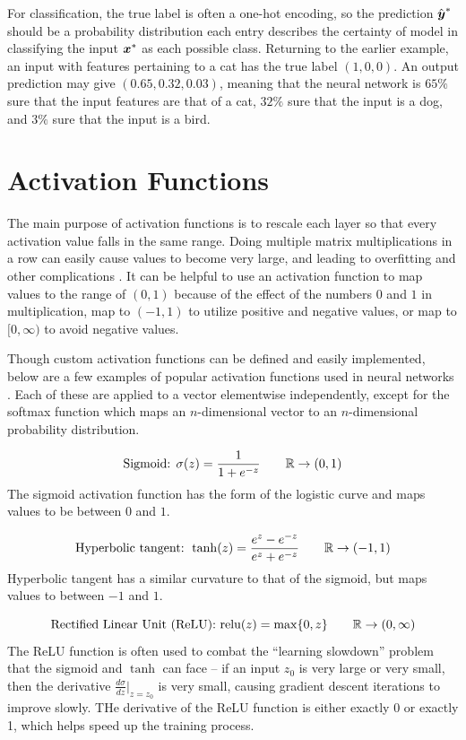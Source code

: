 For classification, the true label is often a one-hot encoding, so the prediction $\hat{\boldsymbol{y}}^*$ should be a probability distribution each entry describes the certainty of model in classifying the input $\boldsymbol{x}^*$ as each possible class. Returning to the earlier example, an input with features pertaining to a cat has the true label $(1,0,0)$. An output prediction may give $(0.65, 0.32, 0.03)$, meaning that the neural network is $65\%$ sure that the input features are that of a cat, $32\%$ sure that the input is a dog, and $3\%$ sure that the input is a bird.

\section{Activation Functions} \label{apdx:activation_fcns}
The main purpose of activation functions is to rescale each layer so that every activation value falls in the same range. Doing multiple matrix multiplications in a row can easily cause values to become very large, and leading to overfitting and other complications \cite{sibi2013}. It can be helpful to use an activation function to map values to the range of $(0,1)$ because of the effect of the numbers $0$ and $1$ in multiplication, map to $(-1,1)$ to utilize positive and negative values, or map to $[0,\infty)$ to avoid negative values. 

Though custom activation functions can be defined and easily implemented, below are a few examples of popular activation functions used in neural networks \cite{tensorflow} \cite{keras_r}. Each of these are applied to a vector elementwise independently, except for the softmax function which maps an $n$-dimensional vector to an $n$-dimensional probability distribution.

\begin{equation}
  \text{Sigmoid: } \sigma(z) = \frac{1}{1 + e^{-z}} \quad \quad \mathbb{R} \to (0,1) 
  \label{eq:sigmoid_eqn}
\end{equation}
The sigmoid activation function has the form of the logistic curve and maps values to be between $0$ and $1$.

\begin{equation}
  \text{Hyperbolic tangent: } \tanh(z) = \frac{e^z - e^{-z}}{e^z + e^{-z}} \quad \quad \mathbb{R} \to (-1,1)
  \label{eq:tanh_eqn}
\end{equation}
Hyperbolic tangent has a similar curvature to that of the sigmoid, but maps values to between $-1$ and $1$. 

\begin{equation}
  \text{Rectified Linear Unit (ReLU): } \text{relu}(z) = \max\{0, z\} \quad \quad \mathbb{R} \to (0,\infty)
  \label{eq:relu_eqn}
\end{equation}
The ReLU function is often used to combat the ``learning slowdown'' problem that the sigmoid and $\tanh$ can face -- if an input $z_0$ is very large or very small, then the derivative $\frac{d\sigma}{dz} \Big|_{z=z_0}$ is very small, causing gradient descent iterations to improve slowly. THe derivative of the ReLU function is either exactly 0 or exactly 1, which helps speed up the training process.

